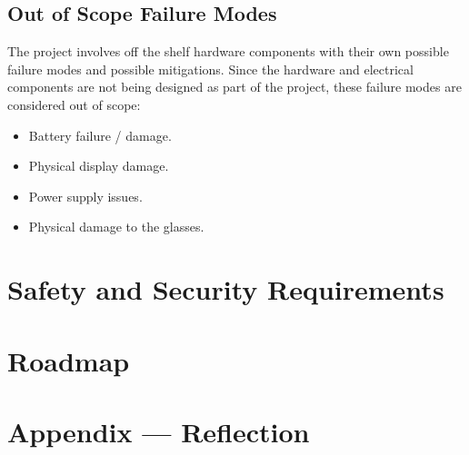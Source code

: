 \documentclass{article}
\begin{document}
\restoregeometry

\pdfpagewidth=8.5in
\pdfpageheight=11in

\subsection{Out of Scope Failure Modes}
The project involves off the shelf hardware components with their own possible
failure modes and possible mitigations. Since the hardware and electrical 
components are not being designed as part of the project, 
these failure modes are considered out of scope:
\begin{itemize}
    \item Battery failure / damage.
    \item Physical display damage.
    \item Power supply issues.
    \item Physical damage to the glasses.
\end{itemize}


\section{Safety and Security Requirements}


\section{Roadmap}


\newpage{}

\section*{Appendix --- Reflection}
\end{document}
